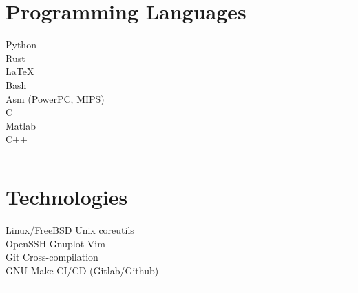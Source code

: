 \documentclass[letterpaper]{deedy-resume}
\begin{document}
\begin{minipage}[t]{0.3\textwidth}

\section{Programming Languages}

\vspace{1em}

\textbullet{} Python \\
\textbullet{} Rust\\
\textbullet{} \LaTeX \\
\textbullet{} Bash \\
\textbullet{} Asm (PowerPC, MIPS) \\
\textbullet{} C \\
\textbullet{} Matlab \\
\textbullet{} C++ \\

\sectionspace %
\vspace{-1ex}
\rule{5cm}{0.5pt}
\vspace{2em}

\section{Technologies}

\vspace{1em}

Linux/FreeBSD \textbullet{} Unix coreutils\\
OpenSSH \textbullet{} Gnuplot \textbullet{} Vim\\
Git \textbullet{} Cross-compilation\\
GNU Make \textbullet{} CI/CD (Gitlab/Github)
\sectionspace
\vspace{-1.5ex}
\rule{5cm}{0.5pt}
\vspace{2em}





\end{minipage}
\end{document}
